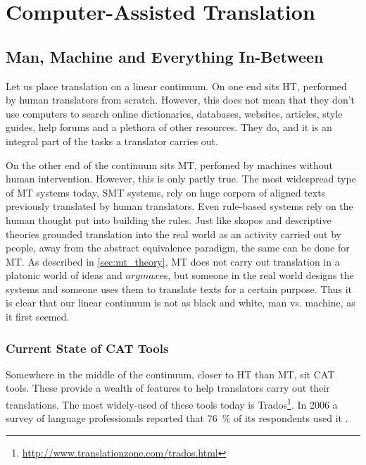 \chapter{Computer-Assisted Translation} 
\label{ch:cat} 


\section{Man, Machine and Everything In-Between}

\noindent Let us place translation on a linear continuum. On one end sits \ac{HT}, performed by human translators from scratch. However, this does not mean that they don't use computers to search online dictionaries, databases, websites, articles, style guides, help forums and a plethora of other resources. They do, and it is an integral part of the tasks a translator carries out. 

On the other end of the continuum sits \ac{MT}, perfomed by machines without human intervention. However, this is only partly true. The most widespread type of \ac{MT} systems today, \ac{SMT} systems, rely on huge corpora of aligned texts previously translated by human translators. Even rule-based systems rely on the human thought put into building the rules. Just like skopos and descriptive theories grounded translation into the real world as an activity carried out by people, away from the abstract equivalence paradigm, the same can be done for \ac{MT}. As described in \autoref{sec:mt_theory}, \ac{MT} does not carry out translation in a platonic world of ideas and $argmax$es, but someone in the real world designs the systems and someone uses them to translate texts for a certain purpose. Thus it is clear that our linear continuum is not as black and white, man vs. machine, as it first seemed.


\subsection{Current State of CAT Tools}

\noindent Somewhere in the middle of the continuum, closer to \ac{HT} than \ac{MT}, sit \ac{CAT} tools. These provide a wealth of features to help translators carry out their translations. The most widely-used of these tools today is Trados\footnote{\url{http://www.translationzone.com/trados.html}}. In 2006 a survey of language professionals reported that 76~\% of its respondents used it \parencite{lagoudaki2006translation}.

